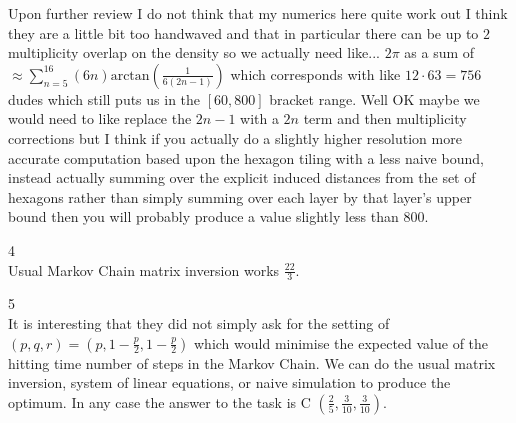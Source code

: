 Upon further review I do not think that my numerics here quite work out I think they are a little bit too handwaved and that in particular there can be up to $2$ multiplicity overlap on the density so we actually need like... $2 \pi$ as a sum of $\approx \sum_{n=5}^{16} (6 n) \text{arctan} \left( \frac{1}{6 (2 n - 1)} \right)$ which corresponds with like $12 \cdot 63 = 756$ dudes which still puts us in the $[60,800]$ bracket range. Well OK maybe we would need to like replace the $2n-1$ with a $2n$ term and then multiplicity corrections but I think if you actually do a slightly higher resolution more accurate computation based upon the hexagon tiling with a less naive bound, instead actually summing over the explicit induced distances from the set of hexagons rather than simply summing over each layer by that layer's upper bound then you will probably produce a value slightly less than $800$.

4 \\
Usual Markov Chain matrix inversion works $\frac{22}{3}$.

5 \\
It is interesting that they did not simply ask for the setting of $(p,q,r)=\left( p,1-\frac{p}{2},1-\frac{p}{2} \right)$ which would minimise the expected value of the hitting time number of steps in the Markov Chain. We can do the usual matrix inversion, system of linear equations, or naive simulation to produce the optimum. In any case the answer to the task is C $\left( \frac{2}{5},\frac{3}{10},\frac{3}{10} \right)$.

